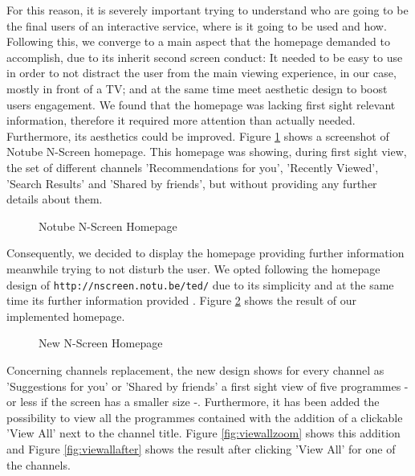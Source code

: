 \documentclass{acm_proc_article-sp}
\begin{document}
For this reason, it is severely important trying to understand who are going to be the final users of an interactive service, where is it going to be used and how. Following this, we converge to a main aspect that the homepage demanded to accomplish, due to its inherit second screen conduct: It needed to be easy to use in order to not distract the user from the main viewing experience, in our case, mostly in front of a TV; and at the same time meet aesthetic design to boost users engagement. We found that the homepage  was lacking first sight relevant information, therefore it required more attention than actually needed. Furthermore, its aesthetics could be improved. Figure \ref{fig:oldhomepage} shows a screenshot of Notube N-Screen homepage. This homepage was showing, during first sight view, the set of different channels 'Recommendations for you', 'Recently Viewed', 'Search Results' and 'Shared by friends', but without providing any further details about them. 

\begin{figure}[!htb]
\centering
{}
\caption{Notube N-Screen Homepage}
\label{fig:oldhomepage}
\end{figure}

Consequently, we decided to display the homepage providing further information meanwhile trying to not disturb the user\cite{colborne2010simple}\cite{krug2014don}\cite{norman2002design}. We opted following the homepage design of \texttt{http://nscreen.notu.be/ted/} due to its simplicity and at the same time its further information provided \cite{nielsen2002homepage}. Figure \ref{fig:newhomepage} shows the result of our implemented homepage. 

\begin{figure}[!htb]
\centering
{}
\caption{New N-Screen Homepage}
\label{fig:newhomepage}
\end{figure}

Concerning channels replacement, the new design shows for every channel as 'Suggestions for you' or 'Shared by friends' a first sight view of five programmes -or less if the screen has a smaller size -. Furthermore, it has been added the possibility to view all the programmes contained with the addition of a clickable 'View All' next to the channel title. Figure \ref{fig:viewallzoom} shows this addition and Figure \ref{fig:viewallafter} shows the result after clicking 'View All' for one of the channels. 
\end{document}
